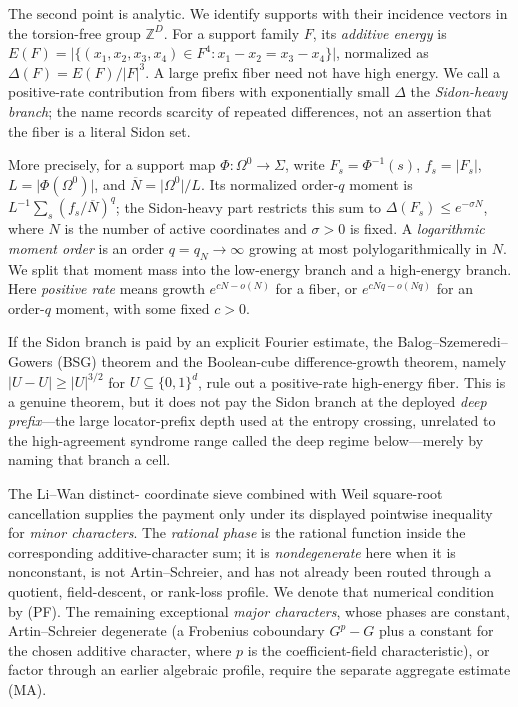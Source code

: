\documentclass[12pt,a4paper]{amsart}
\numberwithin{equation}{section}
\theoremstyle{remark}
\newcommand{\Z}{\mathbb Z}
\newcommand{\barN}{\overline N}
\newcommand{\abs}[1]{\lvert #1\rvert}
\begin{document}
The second point is analytic.  We identify supports with their incidence
vectors in the torsion-free group \(\Z^D\).  For a support family \(F\),
its \emph{additive energy} is
\(E(F)=\abs{\{(x_1,x_2,x_3,x_4)\in F^4:x_1-x_2=x_3-x_4\}}\), normalized
as \(\Delta(F)=E(F)/\abs F^3\).  A large prefix fiber need not have high
energy.  We call a positive-rate contribution from fibers with
exponentially small \(\Delta\) the \emph{Sidon-heavy branch}; the name
records scarcity of repeated differences, not an assertion that the
fiber is a literal Sidon set.

More precisely, for a support map
\(\Phi:\Omega^0\to\Sigma\), write
\(F_s=\Phi^{-1}(s)\), \(f_s=\abs{F_s}\),
\(L=\abs{\Phi(\Omega^0)}\), and
\(\barN=\abs{\Omega^0}/L\).  Its normalized order-\(q\) moment is
\(L^{-1}\sum_s(f_s/\barN)^q\); the Sidon-heavy part restricts this sum to
\(\Delta(F_s)\le e^{-\sigma N}\), where \(N\) is the number of active
coordinates and \(\sigma>0\) is fixed.  A \emph{logarithmic moment order}
is an order \(q=q_N\to\infty\) growing at most polylogarithmically in
\(N\).  We split that moment mass into the low-energy branch and a
high-energy branch.  Here \emph{positive rate} means growth
\(e^{cN-o(N)}\) for a fiber, or \(e^{cNq-o(Nq)}\) for an order-\(q\)
moment, with some fixed \(c>0\).

If the Sidon branch is paid by an explicit Fourier
estimate, the Balog--Szemeredi--Gowers (BSG) theorem and the Boolean-cube
difference-growth theorem, namely
\(\abs{U-U}\ge\abs U^{3/2}\) for \(U\subseteq\{0,1\}^d\), rule out a
positive-rate high-energy fiber.  This is a genuine theorem, but it does
not pay the Sidon branch at the deployed \emph{deep prefix}---the large
locator-prefix depth used at the entropy crossing, unrelated to the
high-agreement syndrome range called the deep regime below---merely by
naming that branch a cell.

The Li--Wan distinct-
coordinate sieve combined with Weil square-root cancellation supplies the
payment only under its displayed pointwise inequality for
\emph{minor characters}.  The \emph{rational phase} is the rational
function inside the corresponding additive-character sum; it is
\emph{nondegenerate} here when it is nonconstant, is not Artin--Schreier,
and has not already been routed through a quotient, field-descent, or
rank-loss profile.  We denote that numerical condition by \textup{(PF)}.
The remaining exceptional \emph{major characters}, whose phases are
constant, Artin--Schreier degenerate (a Frobenius coboundary \(G^p-G\)
plus a constant for the chosen additive character, where \(p\) is the
coefficient-field characteristic), or factor through an
earlier algebraic profile, require the separate aggregate estimate
\textup{(MA)}.
\end{document}
